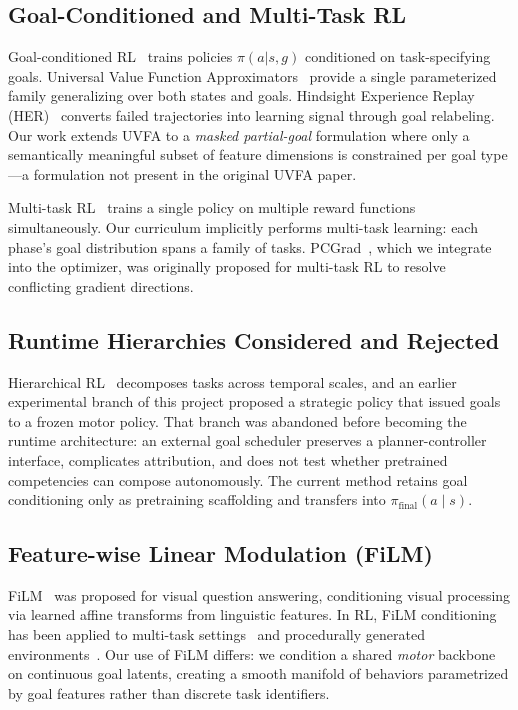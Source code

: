 \documentclass[11pt,a4paper]{article}
\begin{document}
\subsection{Goal-Conditioned and Multi-Task RL}
Goal-conditioned RL~\cite{kaelbling1993learning} trains policies $\pi(a|s,g)$ conditioned on task-specifying goals.
Universal Value Function Approximators~\cite{schaul2015universal} provide a single parameterized family generalizing over both states and goals.
Hindsight Experience Replay (HER)~\cite{andrychowicz2017hindsight} converts failed trajectories into learning signal through goal relabeling.
Our work extends UVFA to a \emph{masked partial-goal} formulation where only a semantically meaningful subset of feature dimensions is constrained per goal type---a formulation not present in the original UVFA paper.

Multi-task RL~\cite{caruana1997multitask,yu2020gradient} trains a single policy on multiple reward functions simultaneously.
Our curriculum implicitly performs multi-task learning: each phase's goal distribution spans a family of tasks.
PCGrad~\cite{yu2020gradient}, which we integrate into the optimizer, was originally proposed for multi-task RL to resolve conflicting gradient directions.

\subsection{Runtime Hierarchies Considered and Rejected}
Hierarchical RL~\cite{barto2003recent,dayan1992feudal} decomposes tasks across temporal scales, and an earlier experimental branch of this project proposed a strategic policy that issued goals to a frozen motor policy. That branch was abandoned before becoming the runtime architecture: an external goal scheduler preserves a planner-controller interface, complicates attribution, and does not test whether pretrained competencies can compose autonomously. The current method retains goal conditioning only as pretraining scaffolding and transfers into $\pi_{\mathrm{final}}(a\mid s)$.

\subsection{Feature-wise Linear Modulation (FiLM)}
FiLM~\cite{perez2018film} was proposed for visual question answering, conditioning visual processing via learned affine transforms from linguistic features.
In RL, FiLM conditioning has been applied to multi-task settings~\cite{rakelly2019efficient} and procedurally generated environments~\cite{lan2023skill}.
Our use of FiLM differs: we condition a shared \emph{motor} backbone on continuous goal latents, creating a smooth manifold of behaviors parametrized by goal features rather than discrete task identifiers.
\end{document}
